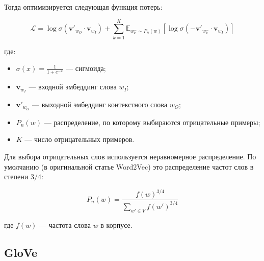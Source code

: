 \documentclass[coursework]{SCWorks}
\begin{document}
Тогда оптимизируется следующая функция потерь:

\[
\mathcal{L} = \log \sigma(\mathbf{v}'_{w_O} \cdot \mathbf{v}_{w_I}) + \sum_{k=1}^{K} \mathbb{E}_{w_k^- \sim P_n(w)} \left[ \log \sigma(-\mathbf{v}'_{w_k^-} \cdot \mathbf{v}_{w_I}) \right]
\]

где:
\begin{itemize}
  \item $\sigma(x) = \frac{1}{1 + e^{-x}}$ — сигмоида;
  \item $\mathbf{v}_{w_I}$ — входной эмбеддинг слова $w_I$;
  \item $\mathbf{v}'_{w_O}$ — выходной эмбеддинг контекстного слова $w_O$;
  \item $P_n(w)$ — распределение, по которому выбираются отрицательные примеры;
  \item $K$ — число отрицательных примеров.
\end{itemize}

Для выбора отрицательных слов используется неравномерное распределение. По умолчанию (в оригинальной статье Word2Vec) это распределение частот слов в степени $3/4$:

\[
P_n(w) = \frac{f(w)^{3/4}}{\sum_{w' \in V} f(w')^{3/4}}
\]

где $f(w)$ — частота слова $w$ в корпусе.



  
\subsection{GloVe}

\end{document}
